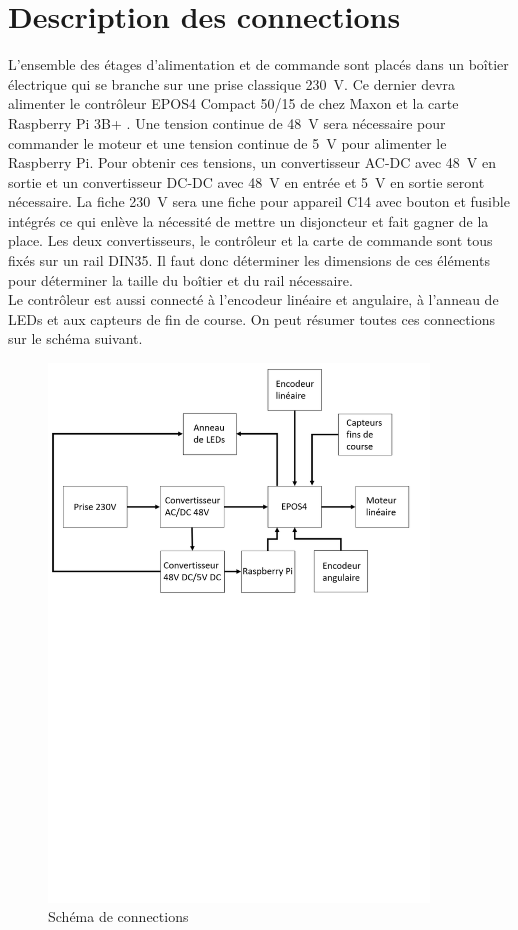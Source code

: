\section{Description des connections}\label{sec:DescConnect}
L'ensemble des étages d'alimentation et de commande sont placés dans un boîtier électrique qui se branche sur une prise classique 230~V. Ce dernier
devra alimenter le contrôleur EPOS4 Compact 50/15 de chez Maxon \cite{Maxon} et la carte Raspberry Pi 3B+ \cite{RaspberryPi}. Une tension continue de 48~V
sera nécessaire pour commander le moteur et une tension continue de 5~V pour alimenter le Raspberry Pi. Pour obtenir ces tensions,
un convertisseur AC-DC avec 48~V en sortie et un convertisseur DC-DC avec 48~V en entrée et 5~V en sortie seront nécessaire. La fiche 230~V
sera une fiche pour appareil C14 avec bouton et fusible intégrés ce qui enlève la nécessité de mettre un disjoncteur et fait gagner de la place. Les deux
convertisseurs, le contrôleur et la carte de commande sont tous fixés sur un rail DIN35. Il faut donc déterminer les dimensions de ces éléments pour
déterminer la taille du boîtier et du rail nécessaire.\\

Le contrôleur est aussi connecté à l'encodeur linéaire et angulaire, à l'anneau de LEDs et aux capteurs de fin de course. On peut résumer toutes
ces connections sur le schéma suivant.

\begin{figure}[H]
    \centering
    \includegraphics[width = 0.9\textwidth]{assets/figures/SchemaLogique.svg}
    \caption{Schéma de connections}
    \label{fig:SchemaConnec}
\end{figure}

